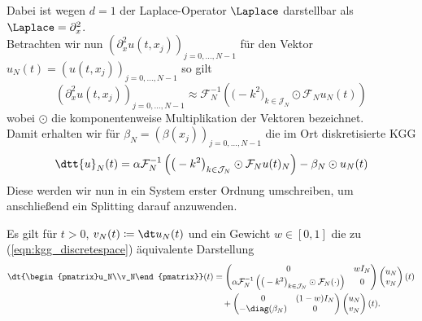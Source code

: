 Dabei ist wegen $d=1$ der Laplace-Operator $\Laplace$ darstellbar als $\Laplace=\partial^2_x$.\\
Betrachten wir nun $(\partial^2_x u(t,x_j))_{j=0,\dots,N-1}$ für den Vektor $u_N(t)=(u(t,x_j))_{j=0,\dots,N-1}$ so gilt
\[(\partial^2_x u(t,x_j))_{j=0,\dots,N-1}\approx \mathcal{F}_N^{-1}\left(\big(-k^2\big)_{k\in\mathcal{J}_N}\odot\mathcal{F}_Nu_N(t)\right)\]
wobei $\odot$ die komponentenweise Multiplikation der Vektoren bezeichnet.\\
Damit erhalten wir für $\beta_N=(\beta(x_j))_{j=0,\dots,N-1}$ die im Ort diskretisierte KGG
\begin{equation}
\label{eqn:kgg_discretespace}
\dtt{u}_N(t)=\alpha \mathcal{F}_N^{-1}\left(\big(-k^2\big)_{k\in\mathcal{J}_N}\odot\mathcal{F}_Nu(t)_N\right) -\beta_N\odot u_N(t)
\end{equation}
Diese werden wir nun in ein System erster Ordnung umschreiben, um anschließend ein Splitting darauf anzuwenden. 

Es gilt für $t>0$, $v_N(t)\coloneqq \dt u_N(t)$ und ein Gewicht $w\in [0,1]$ die zu (\ref{eqn:kgg_discretespace}) äquivalente Darstellung
\begin{align}
\label{eqn:kgg_discrete_first_order_part1}
\dt{\begin{pmatrix}u_N\\v_N\end{pmatrix}}(t)&=
\begin{pmatrix}0 & wI_N\\ \alpha\mathcal{F}_N^{-1}\left(\big(-k^2\big)_{k\in\mathcal{J}_N}\odot\mathcal{F}_N (\cdot )\right) & 0\end{pmatrix}
\begin{pmatrix}u_N\\v_N\end{pmatrix}(t)\\
\label{eqn:kgg_discrete_first_order_part2}
&\quad+\begin{pmatrix}0 & (1-w)I_N\\ -\diag({\beta_N}) & 0\end{pmatrix}
\begin{pmatrix}u_N\\v_N\end{pmatrix}(t).
\end{align}
